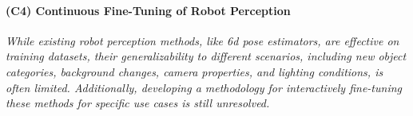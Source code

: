 \documentclass{erc-B2}
\begin{document}

\paragraph{(C4) Continuous Fine-Tuning of Robot Perception}
\textit{While existing robot perception methods, like \gls*{6d} pose estimators, are effective on training datasets, their generalizability to different scenarios, including new object categories, background changes, camera properties, and lighting conditions, is often limited. Additionally, developing a methodology for interactively fine-tuning these methods for specific use cases is still unresolved.}
\end{document}
